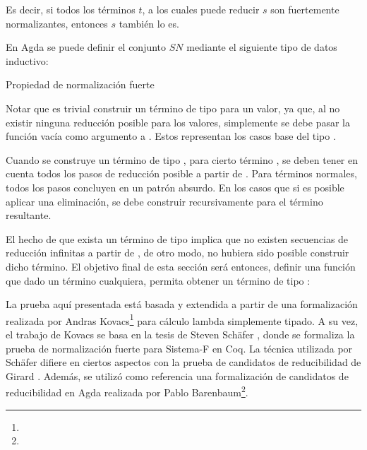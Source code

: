 Es decir, si todos los términos $t$, a los cuales puede reducir $s$ son fuertemente normalizantes, entonces $s$ también lo es. 

En Agda se puede definir el conjunto $SN$ mediante el siguiente tipo de datos inductivo: 

\begin{codigo}
	Propiedad de normalización fuerte
\end{codigo}

Notar que es trivial construir un término de tipo  para un valor, ya que, al no existir ninguna reducción posible para los valores, simplemente se debe pasar la función vacía como argumento a .
Estos representan los casos base del tipo .

\begin{example}
	Cuando se construye un término de tipo  , para cierto término , se deben tener en cuenta todos los pasos de reducción posible a partir de .
	Para términos normales, todos los pasos concluyen en un patrón absurdo.
	En los casos que si es posible aplicar una eliminación, se debe construir recursivamente  para el término resultante.
	
\end{example}

El hecho de que exista un término de tipo   implica que no existen secuencias de reducción infinitas a partir de , de otro modo, no hubiera sido posible construir dicho término.
El objetivo final de esta sección será entonces, definir una función que dado un término cualquiera, permita obtener un término de tipo  :

\vspace{0.5em}
\AgdaSymbol{:}
\AgdaSymbol{\{}
\AgdaSymbol{\}}
\AgdaSymbol{(}
\AgdaSymbol{:}
\AgdaSymbol{)}
\vspace{0.5em}

La prueba aquí presentada está basada y extendida a partir de una formalización realizada por 
Andras Kovacs\footnote{} para cálculo lambda simplemente tipado.
A su vez, el trabajo de Kovacs se basa en la tesis de Steven Schäfer \cite{Schafer}, donde se formaliza la prueba de normalización fuerte para Sistema-F en Coq.
La técnica utilizada por Schäfer difiere en ciertos aspectos con la prueba de candidatos de reducibilidad de Girard \cite{Girard}.
Además, se utilizó como referencia una formalización de candidatos de reducibilidad en Agda realizada por Pablo Barenbaum\footnote{}.

